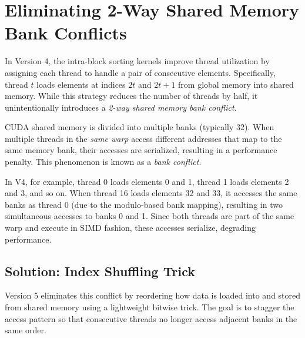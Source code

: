 \documentclass{article}
\begin{document}

\section{Eliminating 2-Way Shared Memory Bank Conflicts}

In Version 4, the intra-block sorting kernels improve thread utilization by assigning each thread to 
handle a pair of consecutive elements. Specifically, thread $t$ loads elements at indices $2t$ and 
$2t + 1$ from global memory into shared memory. While this strategy reduces the number of threads by half, 
it unintentionally introduces a \textit{2-way shared memory bank conflict}.

CUDA shared memory is divided into multiple banks (typically 32). When multiple threads in the \textit{same warp}
access different addresses that map to the same memory bank, their accesses are serialized, resulting in a 
performance penalty. This phenomenon is known as a \textit{bank conflict}.

In V4, for example, thread 0 loads elements 0 and 1, thread 1 loads elements 2 and 3, and so on. When thread 16 
loads elements 32 and 33, it accesses the same banks as thread 0 (due to the modulo-based bank mapping), 
resulting in two simultaneous accesses to banks 0 and 1. Since both threads are part of the same warp and execute 
in SIMD fashion, these accesses serialize, degrading performance.

\subsection*{Solution: Index Shuffling Trick}

Version 5 eliminates this conflict by reordering how data is loaded into and stored from shared memory using 
a lightweight bitwise trick. The goal is to stagger the access pattern so that consecutive threads no longer 
access adjacent banks in the same order.
\end{document}
